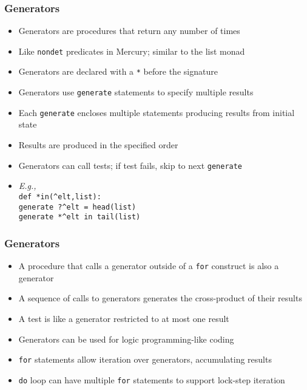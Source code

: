 \documentclass[12pt]{beamer}
\begin{document}
\begin{frame}[fragile]
\frametitle{Generators}
\begin{itemize}
\item Generators are procedures that return any number of times
\item Like \texttt{nondet} predicates in Mercury; similar to the list monad
\item Generators are declared with a \texttt{*} before the signature
\item Generators use \texttt{generate} statements to specify
  multiple results
\item Each \texttt{generate} encloses multiple statements producing
  results from initial state
\item Results are produced in the specified order
\item Generators can call tests; if test fails, skip to next \texttt{generate}
\item \emph{E.g.,} \\
  \hspace*{2em}\texttt{def *in(\^{ }elt,list):} \\
  \hspace*{4em}\texttt{generate ?\^{ }elt = head(list)} \\
  \hspace*{4em}\texttt{generate *\^{ }elt in tail(list)} \\

\end{itemize}
\end{frame}


\begin{frame}[fragile]
\frametitle{Generators}
\begin{itemize}
\item A procedure that calls a generator outside of a \texttt{for}
  construct is also a generator
\item A sequence of calls to generators generates the cross-product of
  their results
\item A test is like a generator restricted to at most one result
\item Generators can be used for logic programming-like coding
\item \texttt{for} statements allow iteration over generators,
  accumulating results
\item \texttt{do} loop can have multiple \texttt{for} statements to
  support lock-step iteration
\end{itemize}
\end{frame}
\end{document}
